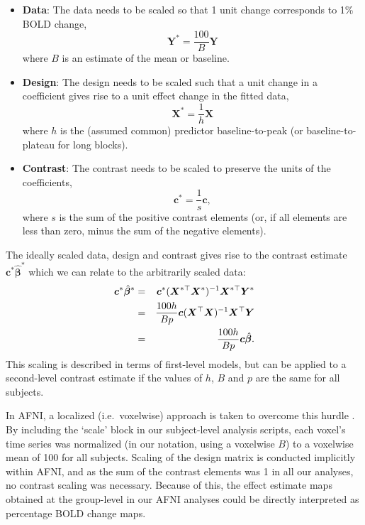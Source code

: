 \begin{itemize}
\item {\bf Data}: The data needs to be scaled so that 1 unit change corresponds to 1\% BOLD change, 
\begin{equation}
\label{eq:SC_sup_data_scale}
\bm{Y}^{*} = \frac{100}{B} \bm{Y}
\end{equation}
where $B$ is an estimate of the mean or baseline.
\item {\bf Design}:  The design needs to be scaled such that a unit change in a coefficient gives rise to a unit effect change in the fitted data, 
\begin{equation}
\label{eq:SC_sup_design_scale}
\bm{X}^{*} = \frac{1}{h} \bm{X}
\end{equation}
where $h$ is the (assumed common) predictor baseline-to-peak (or baseline-to-plateau for long blocks).
\item {\bf Contrast}: The contrast needs to be scaled to preserve the units of the coefficients, 
\begin{equation}
\label{eq:SC_sup_contrast_scale}
\bm{c}^*=\frac{1}{s}\bm{c},
\end{equation}
where $s$ is the sum of the positive contrast elements (or, if all elements are less than zero, minus the sum of the negative elements).
\end{itemize}

  The ideally scaled data, design and contrast gives rise to the contrast estimate $\bm{c}^*\hat{\bm{\beta}}^*$ which we can relate to the arbitrarily scaled data:
\begin{eqnarray}
\label{eq:SC_sup_ideal_scale}
\bm{c}^*\hat{\bm{\beta}}^* &=& \bm{c}^*(\bm{X}^{*\top}\bm{X}^*)^{-1}\bm{X}^{*\top}\bm{Y}^* \notag\\
                          &=& \frac{100h}{Bp}\bm{c}(\bm{X}^{\top}\bm{X})^{-1}\bm{X}^{\top}\bm{Y} \notag\\
                          &=& \frac{100h}{Bp}\bm{c}\hat{\bm{\beta}}.
\end{eqnarray}
This scaling is described in terms of first-level models, but can be applied to a second-level contrast estimate if the values of $h$, $B$ and $p$ are the same for all subjects.

In AFNI, a localized (i.e.\ voxelwise) approach is taken to overcome this hurdle \citep{Chen2017-sb}. By including the `scale' block in our subject-level analysis scripts, each voxel's time series was normalized (in our notation, using a voxelwise $B$) to a voxelwise mean of 100 for all subjects. Scaling of the design matrix is conducted implicitly within AFNI, and as the sum of the contrast elements was 1 in all our analyses, no contrast scaling was necessary. Because of this, the effect estimate maps obtained at the group-level in our AFNI analyses could be directly interpreted as percentage BOLD change maps. 

